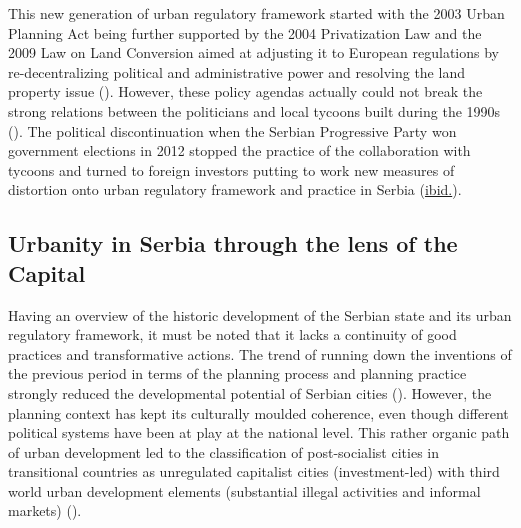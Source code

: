 \documentclass[11pt]{report}
\begin{document}
{{{{This new generation of urban regulatory framework started with the 2003 Urban Planning Act being further supported by the 2004 Privatization Law and the 2009 Law on Land Conversion aimed at adjusting it to European regulations by re-decentralizing political and administrative power and resolving the land property issue (\href{Cagic}{\citealt{cagic_zakoni_2014}}). However, these policy agendas actually could not break the strong relations between the politicians and local tycoons built during the 1990s  (\href{Peric}{\citealt{peric_evolution_2016}}).
The political discontinuation when the Serbian Progressive Party won government elections in 2012 stopped the practice of the collaboration with tycoons and turned to foreign investors putting to work new measures of distortion onto urban regulatory framework and practice in Serbia (\href{Peric}{ibid.}).
            
\subsection{Urbanity in Serbia through the lens of the Capital}

Having an overview of the historic development of the Serbian state and its urban regulatory framework, it must be noted that it lacks a continuity of good practices and transformative actions. The trend of running down the inventions of the previous period in terms of the planning process and planning practice strongly reduced the developmental potential of Serbian cities (\href{Peric}{\citealt{peric_evolution_2016}}). However, the planning context has kept its culturally moulded coherence, even though different political systems have been at play at the national level.
This rather organic path of urban development led to the classification of post-socialist cities in transitional countries as unregulated capitalist cities (investment-led) with third world urban development elements (substantial illegal activities and informal markets) (\href{Petrovic}{\citealt{petrovic_cities_2009}}).
\\ 

}}}}
\end{document}

